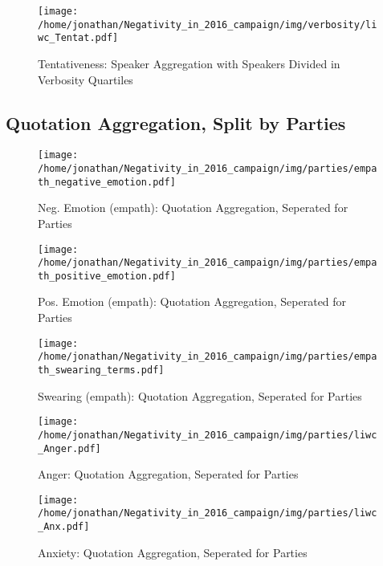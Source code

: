 \begin{figure}[h]\centering
	\texttt{[image: /home/jonathan/Negativity\_in\_2016\_campaign/img/verbosity/liwc\_Tentat.pdf]}
	\caption{Tentativeness: Speaker Aggregation with Speakers Divided in Verbosity Quartiles}
	\label{fig: verbosity_Tentativeness}
\end{figure}

\clearpage
\pagebreak

\subsection{Quotation Aggregation, Split by Parties}

\begin{figure}[h]\centering
	\texttt{[image: /home/jonathan/Negativity\_in\_2016\_campaign/img/parties/empath\_negative\_emotion.pdf]}
	\caption{Neg. Emotion (empath): Quotation Aggregation, Seperated for Parties}
	\label{fig: parties_Neg. Emotion (empath)}
\end{figure}

\begin{figure}[h]\centering
	\texttt{[image: /home/jonathan/Negativity\_in\_2016\_campaign/img/parties/empath\_positive\_emotion.pdf]}
	\caption{Pos. Emotion (empath): Quotation Aggregation, Seperated for Parties}
	\label{fig: parties_Pos. Emotion (empath)}
\end{figure}

\begin{figure}[h]\centering
	\texttt{[image: /home/jonathan/Negativity\_in\_2016\_campaign/img/parties/empath\_swearing\_terms.pdf]}
	\caption{Swearing (empath): Quotation Aggregation, Seperated for Parties}
	\label{fig: parties_Swearing (empath)}
\end{figure}

\begin{figure}[h]\centering
	\texttt{[image: /home/jonathan/Negativity\_in\_2016\_campaign/img/parties/liwc\_Anger.pdf]}
	\caption{Anger: Quotation Aggregation, Seperated for Parties}
	\label{fig: parties_Anger}
\end{figure}

\begin{figure}[h]\centering
	\texttt{[image: /home/jonathan/Negativity\_in\_2016\_campaign/img/parties/liwc\_Anx.pdf]}
	\caption{Anxiety: Quotation Aggregation, Seperated for Parties}
	\label{fig: parties_Anxiety}
\end{figure}

